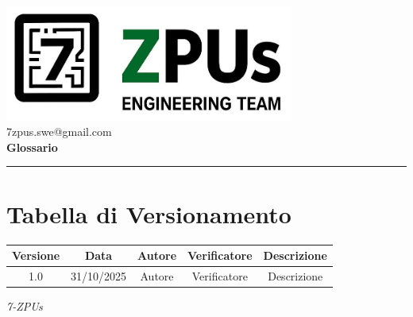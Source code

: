 \documentclass[a4paper,12pt]{article}
\begin{document}
\begin{center}
    \includegraphics[width=9.5cm]{../assets/logo7ZPUs.jpg}\\
    \small\hspace{10cm} 7zpus.swe@gmail.com\\
    \vspace{0.5cm}
    \Large \textbf{Glossario}\\
\end{center}

\vspace{0.3cm}
\hrule
\vspace{0.5cm}

\tableofcontents

\newpage

\section*{Tabella di Versionamento}
\begin{tabular}{|c|c|c|c|c|}
    \hline
    \textbf{Versione} & \textbf{Data} & \textbf{Autore}  & \textbf{Verificatore} & \textbf{Descrizione} \\
    \hline
    1.0 & 31/10/2025 & Autore & Verificatore & Descrizione \\
    \hline

\end{tabular}


\vfill
\begin{flushright}
    \textit{7-ZPUs}
\end{flushright}
\end{document}
